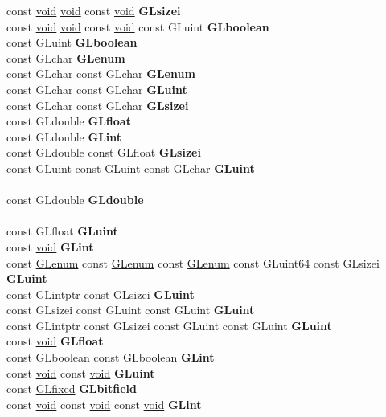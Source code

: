 \begin{DoxyCompactItemize}
\begin{tabbing}
\>const \hyperlink{interfacevoid}{void} \hyperlink{interfacevoid}{void} const \hyperlink{interfacevoid}{void} {\bfseries GLsizei}\\
\>const \hyperlink{interfacevoid}{void} \hyperlink{interfacevoid}{void} const \hyperlink{interfacevoid}{void} const GLuint {\bfseries GLboolean}\\
\>const GLuint {\bfseries GLboolean}\\
\>const GLchar {\bfseries GLenum}\\
\>const GLchar const GLchar {\bfseries GLenum}\\
\>const GLchar const GLchar {\bfseries GLuint}\\
\>const GLchar const GLchar {\bfseries GLsizei}\\
\>const GLdouble {\bfseries GLfloat}\\
\>const GLdouble {\bfseries GLint}\\
\>const GLdouble const GLfloat {\bfseries GLsizei}\\
\>const GLuint const GLuint const GLchar {\bfseries GLuint}\\
\\
\>const GLdouble {\bfseries GLdouble}\\
\\
\>const GLfloat {\bfseries GLuint}\\
\>const \hyperlink{interfacevoid}{void} {\bfseries GLint}\\
\>const \hyperlink{interfacevoid}{GLenum} const \hyperlink{interfacevoid}{GLenum} const \hyperlink{interfacevoid}{GLenum} const GLuint64 const GLsizei {\bfseries GLuint}\\
\>const GLintptr const GLsizei {\bfseries GLuint}\\
\>const GLsizei const GLuint const GLuint {\bfseries GLuint}\\
\>const GLintptr const GLsizei const GLuint const GLuint {\bfseries GLuint}\\
\>const \hyperlink{interfacevoid}{void} {\bfseries GLfloat}\\
\>const GLboolean const GLboolean {\bfseries GLint}\\
\>const \hyperlink{interfacevoid}{void} const \hyperlink{interfacevoid}{void} {\bfseries GLuint}\\
\>const \hyperlink{glheader_8h_ad6d3fa892df40dedf48ee6d84529ae5e}{GLfixed} {\bfseries GLbitfield}\\
\>const \hyperlink{interfacevoid}{void} const \hyperlink{interfacevoid}{void} const \hyperlink{interfacevoid}{void} {\bfseries GLint}\\

\end{tabbing}
\end{DoxyCompactItemize}
